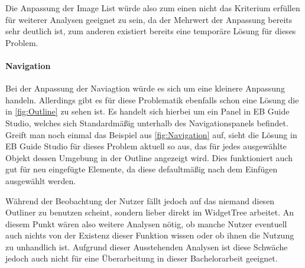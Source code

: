 Die Anpassung der Image List würde also zum einen nicht das Kriterium erfüllen für weiterer Analysen geeignet zu sein, da der Mehrwert der Anpassung bereits sehr deutlich ist, zum anderen existiert bereits eine temporäre Lösung für dieses Problem.

\paragraph{Navigation}
Bei der Anpassung der Naviagtion würde es sich um eine kleinere Anpassung handeln.
Allerdings gibt es für diese Problematik ebenfalls schon eine Lösung die in \cref{fig:Outline} zu sehen ist.
Es handelt sich hierbei um ein Panel in EB Guide Studio, welches sich Standardmäßig unterhalb des Navigationspanels befindet.
Greift man noch einmal das Beispiel aus \cref{fig:Navigation} auf, sieht die Lösung in EB Guide Studio für dieses Problem aktuell so aus, das für jedes ausgewählte Objekt dessen Umgebung in der Outline angezeigt wird.
Dies funktioniert auch gut für neu eingefügte Elemente, da diese defaultmäßig nach dem Einfügen ausgewählt werden.

Während der Beobachtung der Nutzer fällt jedoch auf das niemand diesen Outliner zu benutzen scheint, sondern lieber direkt im WidgetTree arbeitet.
An diesem Punkt wären also weitere Analysen nötig, ob manche Nutzer eventuell auch nichts von der Existenz dieser Funktion wissen oder ob ihnen die Nutzung zu unhandlich ist.
Aufgrund dieser Ausstehenden Analysen ist diese Schwäche jedoch auch nicht für eine Überarbeitung in dieser Bachelorarbeit geeignet.

